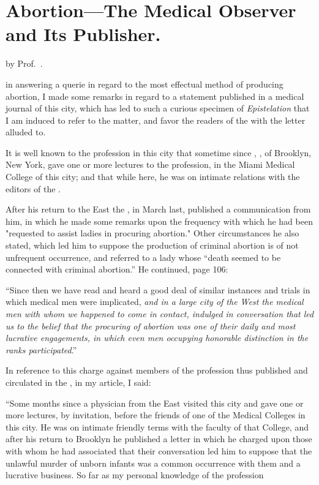 \section*{Abortion---The  Medical  Observer and
Its Publisher.}

by Prof.~.

 in answering a querie in regard to the
most effectual method of producing abortion, I made some remarks in
regard to a statement published in a medical journal of this city, which
has led to such a curious specimen of \emph{Epistelation} that I am induced
to refer to the matter, and favor the readers of the  with the
letter alluded to.

It is well known to the profession in this city that sometime since
, \md, of Brooklyn, New York, gave one or more lectures
to the profession, in the Miami Medical College of this city; and that
while here, he was on intimate relations with the editors of the .

After his return to the East the , in March last, published a
communication from him, in which he made some remarks upon the
frequency with which he had been "requested to assist ladies in procuring
abortion." Other circumstances he also stated, which led him to
suppose the production of criminal abortion is of not unfrequent occurrence,
and referred to a lady whose ``death seemed to be connected with
criminal abortion.''   He continued, page 106:

``Since then we have read and heard a good deal of similar instances
and trials in which medical men were implicated, \emph{and in a large city
of the West the medical men with whom we happened to come in
contact, indulged in conversation that led us to the belief that the
procuring of abortion was one of their daily and most lucrative
engagements, in which even men occupying honorable distinction in
the ranks participated}.''

In reference to this charge against members of the profession thus
published and circulated in the , in my article, I
said:

``Some months since a physician from the East visited this city and
gave one or more lectures, by invitation, before the friends of one of
the Medical Colleges in this city. He was on intimate friendly terms
with the faculty of that College, and after his return to Brooklyn he
published a letter in which he charged upon those with whom he had
associated that their conversation led him to suppose that the unlawful
murder of unborn infants was a common occurrence with them and a
lucrative business.   So far as my personal knowledge of the profession\endinput
